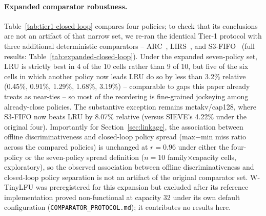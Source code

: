 \paragraph{Expanded comparator robustness.}
Table~\ref{tab:tier1-closed-loop} compares four policies; to check that its
conclusions are not an artifact of that narrow set, we re-ran the identical
Tier-1 protocol with three additional deterministic comparators --
ARC~\cite{megiddo2003arc}, LIRS~\cite{jiang2002lirs}, and
S3-FIFO~\cite{yang2023s3fifo} (full results:
Table~\ref{tab:expanded-closed-loop}). Under the expanded seven-policy set,
LRU is strictly best in 4 of the 10 cells rather than 9 of 10, but five of
the six cells in which another policy now leads LRU do so by less than 3.2\%
relative (0.45\%, 0.91\%, 1.29\%, 1.68\%, 3.19\%) -- comparable to gaps this
paper already treats as near-ties -- so most of the reordering is fine-grained
jockeying among already-close policies. The substantive exception remains
metakv/cap128, where S3-FIFO now beats LRU by 8.07\% relative (versus SIEVE's
4.22\% under the original four). Importantly for
Section~\ref{sec:linkage}, the association between offline discriminativeness
and closed-loop policy spread (max$-$min miss ratio across the compared
policies) is unchanged at $r=0.96$ under either the four-policy or the
seven-policy spread definition ($n=10$ family$\times$capacity cells,
exploratory), so the observed association between offline discriminativeness and
closed-loop policy separation is not an artifact of the original comparator
set. W-TinyLFU was preregistered for
this expansion but excluded after its reference implementation proved
non-functional at capacity 32 under its own default configuration
(\texttt{COMPARATOR\_PROTOCOL.md}); it contributes no results here.
